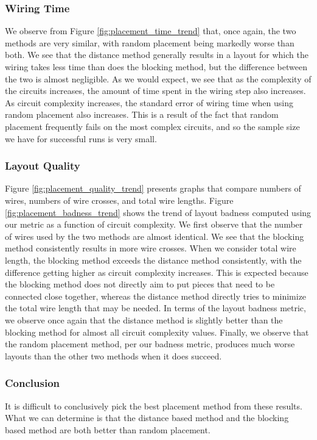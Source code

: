 \subsubsection{Wiring Time}
We observe from
Figure \ref{fig:placement_time_trend} that, once again, the two methods are
very similar, with random placement being markedly worse than both.
We see that the distance method generally results in a layout for which the
wiring takes less time than does the blocking method,
but the difference between the two is
almost negligible. As we would expect, we see that as the complexity
of the circuits increases, the amount of time spent in the wiring step also
increases. As circuit complexity increases, the standard error of
wiring time
when using random placement also increases. This is a result of
the fact that random placement frequently fails on the most complex
circuits, and so the sample size we have for successful runs is very small.

\subsubsection{Layout Quality}
Figure
\ref{fig:placement_quality_trend} presents graphs that compare numbers of wires,
numbers of wire crosses, and total wire lengths.
Figure \ref{fig:placement_badness_trend} shows the trend of layout badness
computed using our metric as a function of circuit complexity.
We first observe that the
number of wires used by the two methods are almost identical. We see that the
blocking method consistently results in more wire crosses. When we consider
total wire length, the blocking
method exceeds the distance method consistently, with the difference getting
higher as circuit complexity increases.
This is expected because the blocking method does not directly aim to
put pieces that need to be connected close together, whereas the distance method
directly tries to minimize the total wire length that may be needed. In terms
of the layout badness metric, we observe once again that the distance method
is slightly better than the blocking method for almost all circuit complexity
values. Finally, we observe that the random
placement method, per our badness metric, produces much worse layouts than the
other two methods when it does succeed.

\subsubsection{Conclusion}
It is difficult to conclusively pick the best placement method from these
results. What we can determine is that the distance based method and the
blocking based method are both better than random placement.


